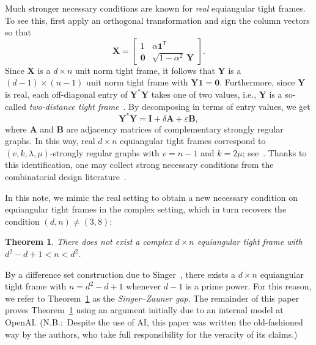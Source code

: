 \documentclass{article}
\theoremstyle{plain}
\newtheorem{theorem}{Theorem}
\theoremstyle{definition}
\begin{document}
Much stronger necessary conditions are known for \textit{real} equiangular tight frames.
To see this, first apply an orthogonal transformation and sign the column vectors so that
\begin{equation}
\label{eq.block form}
\boldsymbol{X}
=\left[\begin{array}{cc}
1&\alpha\mathbf{1}^{\mathsf{T}}\\
\mathbf{0}&\sqrt{1-\alpha^2}\, \boldsymbol{Y}
\end{array}\right].
\end{equation}
Since $\boldsymbol{X}$ is a $d\times n$ unit norm tight frame, it follows that $\boldsymbol{Y}$ is a $(d-1)\times (n-1)$ unit norm tight frame with $\boldsymbol{Y}\boldsymbol{1}=\boldsymbol{0}$.
Furthermore, since $\boldsymbol{Y}$ is real, each off-diagonal entry of $\boldsymbol{Y}^*\boldsymbol{Y}$ takes one of two values, i.e., $\boldsymbol{Y}$ is a so-called \textit{two-distance tight frame}~\cite{BargGOY:15}.
By decomposing in terms of entry values, we get
\[
\boldsymbol{Y}^*\boldsymbol{Y}
=\boldsymbol{I}+\delta\boldsymbol{A}+\varepsilon\boldsymbol{B},
\]
where $\boldsymbol{A}$ and $\boldsymbol{B}$ are adjacency matrices of complementary strongly regular graphs.
In this way, real $d\times n$ equiangular tight frames correspond to $(v,k,\lambda,\mu)$-strongly regular graphs with $v=n-1$ and $k=2\mu$; see~\cite{Waldron:09}.
Thanks to this identification, one may collect strong necessary conditions from the combinatorial design literature~\cite{BrouwerVM:22}.

In this note, we mimic the real setting to obtain a new necessary condition on equiangular tight frames in the complex setting, which in turn recovers the condition $(d,n)\neq(3,8)$:

\begin{theorem}
\label{thm.singer-zauner gap}
There does not exist a complex $d\times n$ equiangular tight frame with $d^2-d+1<n<d^2$.
\end{theorem}

By a difference set construction due to Singer~\cite{Singer:38}, there exists a $d\times n$ equiangular tight frame with $n=d^2-d+1$ whenever $d-1$ is a prime power.
For this reason, we refer to Theorem~\ref{thm.singer-zauner gap} as the \textit{Singer--Zauner gap}.
The remainder of this paper proves Theorem~\ref{thm.singer-zauner gap} using an argument initially due to an internal model at OpenAI.
(N.B.:\ Despite the use of AI, this paper was written the old-fashioned way by the authors, who take full responsibility for the veracity of its claims.)
\end{document}
